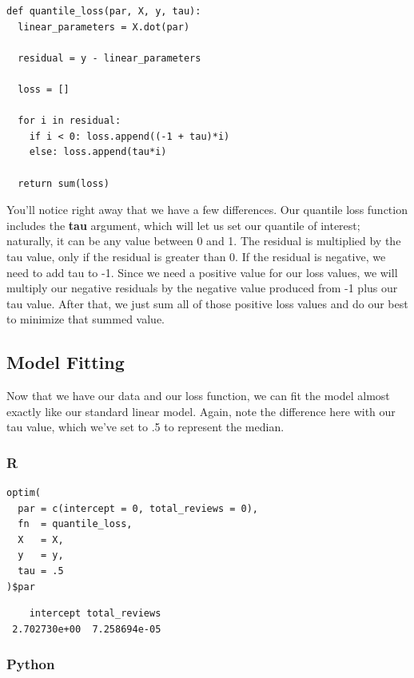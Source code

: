 \documentclass[
  letterpaper,
]{krantz}
\begin{document}
\begin{verbatim}
def quantile_loss(par, X, y, tau):
  linear_parameters = X.dot(par)
  
  residual = y - linear_parameters
  
  loss = []

  for i in residual:
    if i < 0: loss.append((-1 + tau)*i)
    else: loss.append(tau*i)
  
  return sum(loss)
\end{verbatim}

You'll notice right away that we have a few differences. Our quantile
loss function includes the \textbf{tau} argument, which will let us set
our quantile of interest; naturally, it can be any value between 0 and
1. The residual is multiplied by the tau value, only if the residual is
greater than 0. If the residual is negative, we need to add tau to -1.
Since we need a positive value for our loss values, we will multiply our
negative residuals by the negative value produced from -1 plus our tau
value. After that, we just sum all of those positive loss values and do
our best to minimize that summed value.

\subsection{Model Fitting}\label{sec-quantile-model}

Now that we have our data and our loss function, we can fit the model
almost exactly like our standard linear model. Again, note the
difference here with our tau value, which we've set to .5 to represent
the median.

\subsubsection{R}

\begin{verbatim}
optim(
  par = c(intercept = 0, total_reviews = 0),
  fn  = quantile_loss,
  X   = X,
  y   = y,
  tau = .5
)$par
\end{verbatim}

\begin{verbatim}
    intercept total_reviews 
 2.702730e+00  7.258694e-05 
\end{verbatim}

\subsubsection{Python}
\end{document}
